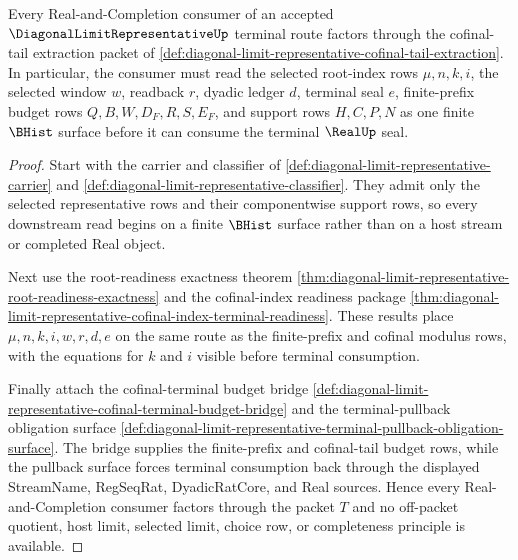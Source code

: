 \begin{theorem}
\label{thm:diagonal-limit-representative-cofinal-tail-coverage}
Every Real-and-Completion consumer of an accepted $\DiagonalLimitRepresentativeUp$ terminal route factors through the cofinal-tail extraction packet of \autoref{def:diagonal-limit-representative-cofinal-tail-extraction}. In particular, the consumer must read the selected root-index rows $\mu,n,k,i$, the selected window $w$, readback $r$, dyadic ledger $d$, terminal seal $e$, finite-prefix budget rows $Q,B,W,D_F,R,S,E_F$, and support rows $H,C,P,N$ as one finite $\BHist$ surface before it can consume the terminal $\RealUp$ seal.
\end{theorem}
\begin{proof}
Start with the carrier and classifier of \autoref{def:diagonal-limit-representative-carrier} and \autoref{def:diagonal-limit-representative-classifier}. They admit only the selected representative rows and their componentwise support rows, so every downstream read begins on a finite $\BHist$ surface rather than on a host stream or completed Real object.

Next use the root-readiness exactness theorem \autoref{thm:diagonal-limit-representative-root-readiness-exactness} and the cofinal-index readiness package \autoref{thm:diagonal-limit-representative-cofinal-index-terminal-readiness}. These results place $\mu,n,k,i,w,r,d,e$ on the same route as the finite-prefix and cofinal modulus rows, with the equations for $k$ and $i$ visible before terminal consumption.

Finally attach the cofinal-terminal budget bridge \autoref{def:diagonal-limit-representative-cofinal-terminal-budget-bridge} and the terminal-pullback obligation surface \autoref{def:diagonal-limit-representative-terminal-pullback-obligation-surface}. The bridge supplies the finite-prefix and cofinal-tail budget rows, while the pullback surface forces terminal consumption back through the displayed StreamName, RegSeqRat, DyadicRatCore, and Real sources. Hence every Real-and-Completion consumer factors through the packet $T$ and no off-packet quotient, host limit, selected limit, choice row, or completeness principle is available.
\end{proof}

